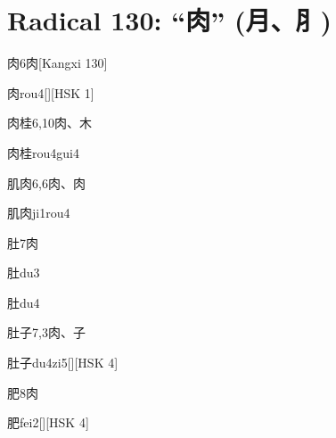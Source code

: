 
\section*{Radical 130: ``⾁'' (月、⺼)}

\begin{entry}{肉}{6}{⾁}[Kangxi 130]
  \begin{phonetics}{肉}{rou4}[][HSK 1]
  \end{phonetics}
\end{entry}

\begin{entry}{肉桂}{6,10}{⾁、⽊}
  \begin{phonetics}{肉桂}{rou4gui4}
  \end{phonetics}
\end{entry}

\begin{entry}{肌肉}{6,6}{⾁、⾁}
  \begin{phonetics}{肌肉}{ji1rou4}
  \end{phonetics}
\end{entry}

\begin{entry}{肚}{7}{⾁}
  \begin{phonetics}{肚}{du3}
  \end{phonetics}
  \begin{phonetics}{肚}{du4}
  \end{phonetics}
\end{entry}

\begin{entry}{肚子}{7,3}{⾁、⼦}
  \begin{phonetics}{肚子}{du4zi5}[][HSK 4]
  \end{phonetics}
\end{entry}

\begin{entry}{肥}{8}{⾁}
  \begin{phonetics}{肥}{fei2}[][HSK 4]
  \end{phonetics}
\end{entry}

